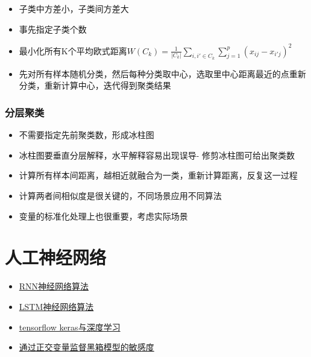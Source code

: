 \documentclass[
]{book}
\providecommand{\tightlist}{%
  \setlength{\itemsep}{0pt}\setlength{\parskip}{0pt}}
\begin{document}
\begin{itemize}
\tightlist
\item
  子类中方差小，子类间方差大
\item
  事先指定子类个数
\item
  最小化所有K个平均欧式距离\(W(C_k) = \frac{1}{|C_k|} \sum_{i,i' \in C_k} \sum_{j = 1}^{p} (x_{ij} - x_{i'j})^2\)
\item
  先对所有样本随机分类，然后每种分类取中心，选取里中心距离最近的点重新分类，重新计算中心，迭代得到聚类结果
\end{itemize}

\hypertarget{ux5206ux5c42ux805aux7c7b}{%
\subsubsection{分层聚类}\label{ux5206ux5c42ux805aux7c7b}}

\begin{itemize}
\tightlist
\item
  不需要指定先前聚类数，形成冰柱图
\item
  冰柱图要垂直分层解释，水平解释容易出现误导- 修剪冰柱图可给出聚类数
\item
  计算所有样本间距离，越相近就融合为一类，重新计算距离，反复这一过程
\item
  计算两者间相似度是很关键的，不同场景应用不同算法
\item
  变量的标准化处理上也很重要，考虑实际场景
\end{itemize}

\hypertarget{ux4ebaux5de5ux795eux7ecfux7f51ux7edc}{%
\section{人工神经网络}\label{ux4ebaux5de5ux795eux7ecfux7f51ux7edc}}

\begin{itemize}
\tightlist
\item
  \href{http://karpathy.github.io/2015/05/21/rnn-effectiveness/}{RNN神经网络算法}
\item
  \href{http://livefreeordichotomize.com/2017/11/08/lstm-neural-nets-as-told-by-baseball/}{LSTM神经网络算法}
\item
  \href{https://rstd.io/ml-with-tensorflow-and-r/}{tensorflow keras与深度学习}
\item
  \href{http://blog.fastforwardlabs.com/2017/03/09/fairml-auditing-black-box-predictive-models.html}{通过正交变量监督黑箱模型的敏感度}
\end{itemize}
\end{document}
